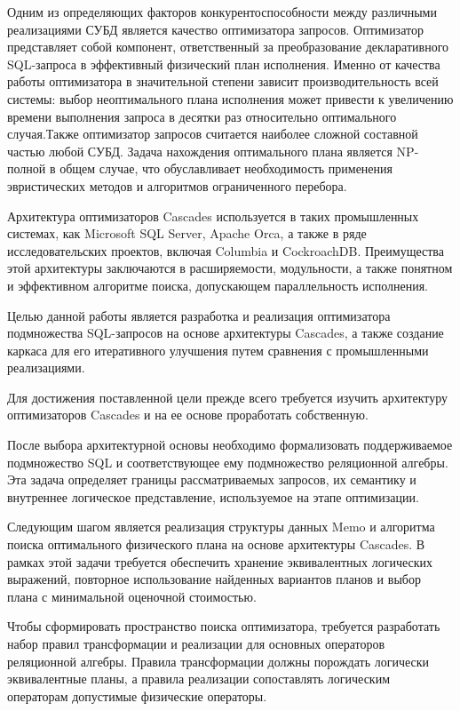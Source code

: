 \documentclass[14pt, russian]{scrartcl}
\begin{document}
Одним из определяющих факторов конкурентоспособности между различными
реализациями СУБД является качество оптимизатора запросов. Оптимизатор
представляет собой компонент, ответственный за преобразование декларативного
SQL-запроса в эффективный физический план исполнения. Именно от качества работы
оптимизатора в значительной степени зависит производительность всей системы:
выбор неоптимального плана исполнения может привести к увеличению времени
выполнения запроса в десятки раз относительно оптимального случая.Также
оптимизатор запросов считается наиболее сложной составной частью любой СУБД.
Задача нахождения оптимального плана является NP-полной в общем случае, что
обуславливает необходимость применения эвристических методов и алгоритмов
ограниченного перебора.

Архитектура оптимизаторов Cascades используется в таких промышленных системах,
как Microsoft SQL Server, Apache Orca, а также в ряде исследовательских
проектов, включая Columbia и CockroachDB\@. Преимущества этой архитектуры
заключаются в расширяемости, модульности, а также понятном и эффективном
алгоритме поиска, допускающем параллельность исполнения.

Целью данной работы является разработка и реализация оптимизатора подмножества
SQL-запросов на основе архитектуры Cascades, а также создание каркаса для его
итеративного улучшения путем сравнения с промышленными реализациями.

Для достижения поставленной цели прежде всего требуется изучить архитектуру
оптимизаторов Cascades и на ее основе проработать собственную.

После выбора архитектурной основы необходимо формализовать поддерживаемое
подмножество SQL и соответствующее ему подмножество реляционной алгебры. Эта
задача определяет границы рассматриваемых запросов, их семантику и внутреннее
логическое представление, используемое на этапе оптимизации.

Следующим шагом является реализация структуры данных Memo и алгоритма поиска
оптимального физического плана на основе архитектуры Cascades. В рамках этой
задачи требуется обеспечить хранение эквивалентных логических выражений,
повторное использование найденных вариантов планов и выбор плана с минимальной
оценочной стоимостью.

Чтобы сформировать пространство поиска оптимизатора, требуется разработать набор
правил трансформации и реализации для основных операторов реляционной алгебры.
Правила трансформации должны порождать логически эквивалентные планы, а правила
реализации сопоставлять логическим операторам допустимые физические операторы.
\end{document}
